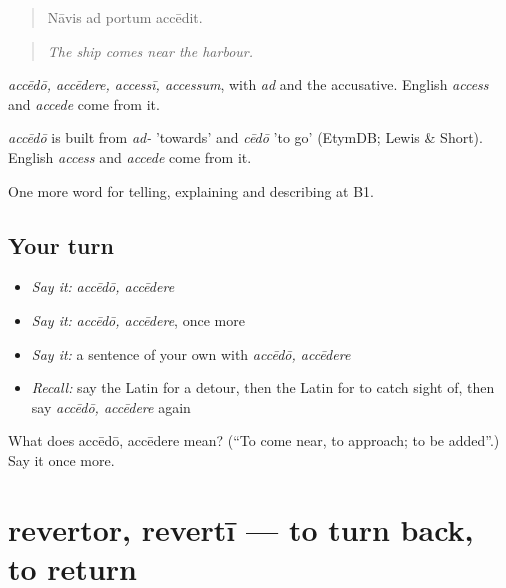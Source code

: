 \begin{quote}
Nāvis ad portum accēdit.
\end{quote}

\begin{quote}
\emph{The ship comes near the harbour.}
\end{quote}

\emph{accēdō, accēdere, accessī, accessum}, with \emph{ad} and the accusative. English \emph{access} and \emph{accede} come from it.

\begin{cousinweb}
\emph{accēdō} is built from \emph{ad-} 'towards' and \emph{cēdō} 'to go' (EtymDB; Lewis \& Short). English \emph{access} and \emph{accede} come from it.
\end{cousinweb}

\begin{grammarlens}[title={What you've built}]
One more word for telling, explaining and describing at B1.
\end{grammarlens}

\subsection*{Your turn}
\begin{itemize}
\raggedright
  \item \emph{Say it:} \emph{accēdō, accēdere}
  \item \emph{Say it:} \emph{accēdō, accēdere}, once more
  \item \emph{Say it:} a sentence of your own with \emph{accēdō, accēdere}
  \item \emph{Recall:} say the Latin for a detour, then the Latin for to catch sight of, then say \emph{accēdō, accēdere} again
\end{itemize}

\begin{tcolorbox}[breakable,colback=teal!4,colframe=teal!35!black,title={Before you move on}]
What does accēdō, accēdere mean? (\textquotedblleft{}To come near, to approach; to be added\textquotedblright{}.) Say it once more.
\end{tcolorbox}
\section[revertor, revertī]{revertor, revertī — to turn back, to return}

\label{lesson:LA-C455-revertor}




